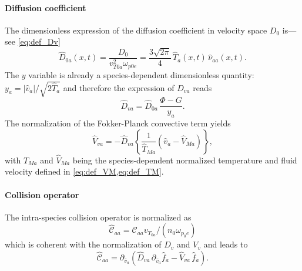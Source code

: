 \documentclass[11pt]{article}
\begin{document}
\paragraph{Diffusion coefficient}
\label{par:diffusion_coefficient}
The dimensionless expression of the diffusion coefficient in velocity space $D_0$ is---see \cref{eq:def_Dv}
%
\begin{equation}
	\hat D_{0a}(x,t) = \frac{D_0}{v_{T0a}^2 \omega_{p0e}}
	= \frac{3\sqrt{2\pi}}{4}\, \hat T_a(x,t) \, \hat \nu_{aa}(x,t).
\end{equation}
%
The $y$ variable is already a species-dependent dimensionless quantity: $y_a = \left| \hat{v}_a \right| /\sqrt{2 \hat{T}_a} $ and therefore the expression of $\hat{D}_{va}$ reads
%
\begin{equation}\label{eq:Dva}
  \hat{D}_{va} = \hat{D}_{0a}\, \dfrac{\Phi - G}{y_a}.
\end{equation}
%
The normalization of the Fokker-Planck convective term yields
%
\begin{equation}\label{eq:nr_vv}
  \hat{V}_{va} = - \hat{D}_{va} \left\{ \dfrac{1}{\hat{T}_{Ma}} \left( \hat{v}_a - \hat{V}_{Ma} \right)  \right\} ,
\end{equation}
%
with $\hat{T}_{Ma}$ and $\hat{V}_{Ma}$ being the species-dependent normalized temperature and fluid velocity defined in \cref{eq:def_VM,eq:def_TM}. 

\paragraph{Collision operator}
\label{par:collision_operator}
The intra-species collision operator is normalized as 
%
\begin{equation}\label{eq:nm_caa}
  \hat{\mathcal{C}}_{aa} = \mathcal{C}_{aa} v_{T_{0a}}/(n_0 \omega_{p_0e})
\end{equation}
%
which is coherent with the normalization of $D_v$ and $V_v$ and leads to
%
\begin{equation}\label{eq:c_aa_nr}
  \hat{\mathcal{C}}_{aa} = \partial_{\hat{v}_a} \left( \hat{D}_{va}\,  \partial_{\hat{v}_a}\hat{f}_a - \hat{V}_{va}\, \hat{f}_a \right) .
\end{equation}
%
\end{document}

